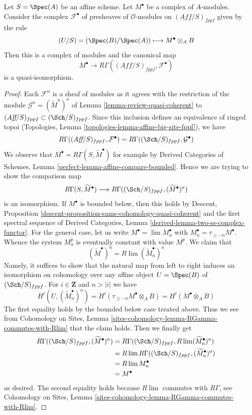 \begin{lemma}
\label{lemma-cohomological-descent-complex-modules}
Let $S = \Spec(A)$ be an affine scheme. Let $M^\bullet$ be a complex
of $A$-modules. Consider the complex $\mathcal{F}^\bullet$ of
presheaves of $\mathcal{O}$-modules on
$(\textit{Aff}/S)_{fppf}$ given by the rule
$$
(U/S) = (\Spec(B)/\Spec(A)) \longmapsto M^\bullet \otimes_A B
$$
Then this is a complex of modules and the canonical map
$$
M^\bullet \longrightarrow
R\Gamma((\textit{Aff}/S)_{fppf}, \mathcal{F}^\bullet)
$$
is a quasi-isomorphism.
\end{lemma}

\begin{proof}
Each $\mathcal{F}^n$ is a sheaf of modules as it agrees with the
restriction of the module $\mathcal{G}^n = (\widetilde{M}^n)^a$ of
Lemma \ref{lemma-review-quasi-coherent} to
$(\textit{Aff}/S)_{fppf} \subset (\Sch/S)_{fppf}$.
Since this inclusion defines an equivalence of ringed topoi
(Topologies, Lemma \ref{topologies-lemma-affine-big-site-fppf}),
we have
$$
R\Gamma((\textit{Aff}/S)_{fppf}, \mathcal{F}^\bullet) =
R\Gamma((\Sch/S)_{fppf}, \mathcal{G}^\bullet)
$$
We observe that $M^\bullet = R\Gamma(S, \widetilde{M}^\bullet)$
for example by Derived Categories of Schemes, Lemma
\ref{perfect-lemma-affine-compare-bounded}. Hence we are trying
to show the comparison map
$$
R\Gamma(S, \widetilde{M}^\bullet)
\longrightarrow
R\Gamma((\Sch/S)_{fppf}, (\widetilde{M}^\bullet)^a)
$$
is an isomorphism. If $M^\bullet$ is bounded below, then this
holds by Descent, Proposition
\ref{descent-proposition-same-cohomology-quasi-coherent}
and the first spectral sequence of Derived Categories, Lemma
\ref{derived-lemma-two-ss-complex-functor}.
For the general case, let us write $M^\bullet = \lim M_n^\bullet$
with $M_n^\bullet = \tau_{\geq -n}M^\bullet$. Whence the system
$M_n^p$ is eventually constant with value $M^p$. We claim that
$$
(\widetilde{M}^\bullet)^a = R\lim (\widetilde{M}_n^\bullet)^a
$$
Namely, it suffices to show that the natural map from left to right
induces an isomorphism on cohomology over any affine object
$U = \Spec(B)$ of $(\Sch/S)_{fppf}$. For $i \in \mathbf{Z}$ and
$n > |i|$ we have
$$
H^i(U, (\widetilde{M}_n^\bullet)^a) =
H^i(\tau_{\geq -n}M^\bullet \otimes_A B) =
H^i(M^\bullet \otimes_A B)
$$
The first equality holds by the bounded below case treated above.
Thus we see from Cohomology on Sites, Lemma
\ref{sites-cohomology-lemma-RGamma-commutes-with-Rlim}
that the claim holds. Then we finally get
\begin{align*}
R\Gamma((\Sch/S)_{fppf}, (\widetilde{M}^\bullet)^a)
& =
R\Gamma((\Sch/S)_{fppf}, R\lim (\widetilde{M}_n^\bullet)^a) \\
& =
R\lim R\Gamma((\Sch/S)_{fppf}, (\widetilde{M}_n^\bullet)^a) \\
& =
R\lim M_n^\bullet \\
& =
M^\bullet
\end{align*}
as desired. The second equality holds because $R\lim$ commutes with
$R\Gamma$, see Cohomology on Sites, Lemma
\ref{sites-cohomology-lemma-RGamma-commutes-with-Rlim}.
\end{proof}